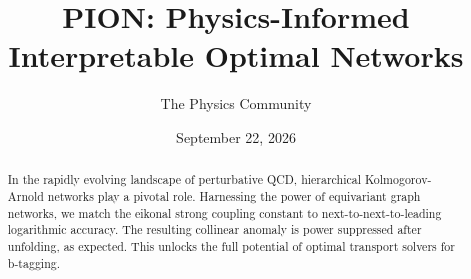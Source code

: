 \documentclass[11pt]{article}
\title{PION: Physics-Informed Interpretable Optimal Networks}
\author{The Physics Community}
\date{September 22, 2026}
\begin{document}
\maketitle
\begin{abstract}
In the rapidly evolving landscape of perturbative QCD, hierarchical
Kolmogorov-Arnold networks play a pivotal role. Harnessing the power of
equivariant graph networks, we match the eikonal strong coupling
constant to next-to-next-to-leading logarithmic accuracy. The resulting
collinear anomaly is power suppressed after unfolding, as expected. This
unlocks the full potential of optimal transport solvers for b-tagging.
\end{abstract}
\tableofcontents





\nocite{*}


\end{document}
